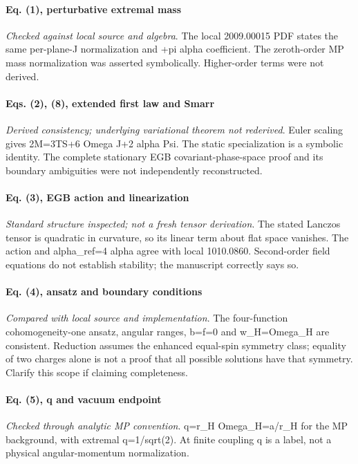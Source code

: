 \documentclass[10pt,a4paper]{article}
\begin{document}
\paragraph{Eq. (1), perturbative extremal mass} \textit{Checked against local source and algebra}. The local 2009.00015 PDF states the same per-plane-J normalization and +pi alpha coefficient. The zeroth-order MP mass normalization was asserted symbolically. Higher-order terms were not derived.

\paragraph{Eqs. (2), (8), extended first law and Smarr} \textit{Derived consistency; underlying variational theorem not rederived}. Euler scaling gives 2M=3TS+6 Omega J+2 alpha Psi. The static specialization is a symbolic identity. The complete stationary EGB covariant-phase-space proof and its boundary ambiguities were not independently reconstructed.

\paragraph{Eq. (3), EGB action and linearization} \textit{Standard structure inspected; not a fresh tensor derivation}. The stated Lanczos tensor is quadratic in curvature, so its linear term about flat space vanishes. The action and alpha\_ref=4 alpha agree with local 1010.0860. Second-order field equations do not establish stability; the manuscript correctly says so.

\paragraph{Eq. (4), ansatz and boundary conditions} \textit{Compared with local source and implementation}. The four-function cohomogeneity-one ansatz, angular ranges, b=f=0 and w\_H=Omega\_H are consistent. Reduction assumes the enhanced equal-spin symmetry class; equality of two charges alone is not a proof that all possible solutions have that symmetry. Clarify this scope if claiming completeness.

\paragraph{Eq. (5), q and vacuum endpoint} \textit{Checked through analytic MP convention}. q=r\_H Omega\_H=a/r\_H for the MP background, with extremal q=1/sqrt(2). At finite coupling q is a label, not a physical angular-momentum normalization.
\end{document}

